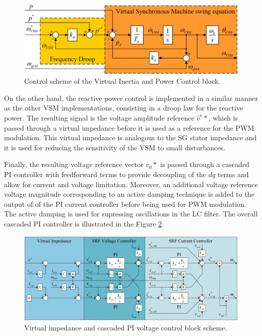 \begin{figure}[ht!]
    \centering
    \includegraphics[width=12cm]{images/CVSM_power.png}
    \caption{Control scheme of the Virtual Inertia and Power Control block\cite{darco2015vsm}.}
    \label{fig:CVSM_power}
\end{figure}

On the other hand, the reactive power control is implemented in a similar manner
as the other VSM implementations, consisting in a droop law for the reactive
power. The resulting signal is the voltage amplitude reference $\hat{v}^r*$,
which is passed through a virtual impedance before it is used as a reference for
the PWM modulation. This virtual impedance is analogous to the SG stator
impedance and it is used for reducing the sensitivity of the VSM to small
disturbances.

Finally, the resulting voltage reference vector $v_0*$ is passed through a
cascaded PI controller with feedforward terms to provide decoupling of the $dq$
terms and allow for current and voltage limitation. Moreover, an additional
voltage reference voltage magnitude corresponding to an active damping technique
is added to the output of of the PI current controller before being used for PWM
modulation. The active damping is used for supressing oscillations in the LC
filter. The overall cascaded PI controller is illustrated in the Figure
\ref{fig:CVSM_cascaded}.

\begin{figure}[ht!]
    \centering
    \includegraphics[width=12cm]{images/CVSM_cascaded.png}
    \caption{Virtual impedance and cascaded PI voltage control block scheme\cite{darco2015vsm}.}
    \label{fig:CVSM_cascaded}
\end{figure}

